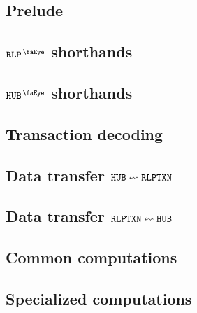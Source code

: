 
\subsection{Prelude                                                \lispTodo{}}  \label{user txn data: processing: user: prelude}                        
\subsection{$\isUserTxnRlpView$ shorthands                         \lispTodo{}}  \label{user txn data: processing: user: rlp view shorthands}            
\subsection{$\isUserTxnHubView$ shorthands                         \lispTodo{}}  \label{user txn data: processing: user: hub view shorthands}            
\subsection{Transaction decoding                                   \lispTodo{}}  \label{user txn data: processing: user: transaction decoding}           
\subsection{Data transfer $\hubMod    \leftsquigarrow \rlpTxnMod$  \lispTodo{}}  \label{user txn data: processing: user: data transafer rlp to hub}      
\subsection{Data transfer $\rlpTxnMod \leftsquigarrow \hubMod   $  \lispTodo{}}  \label{user txn data: processing: user: data transafer hub to rlp}      
\subsection{Common computations                                    \lispTodo{}}  \label{user txn data: processing: user: common computations}            
\subsection{Specialized computations                               \lispTodo{}}  \label{user txn data: processing: user: specialized computations}       
